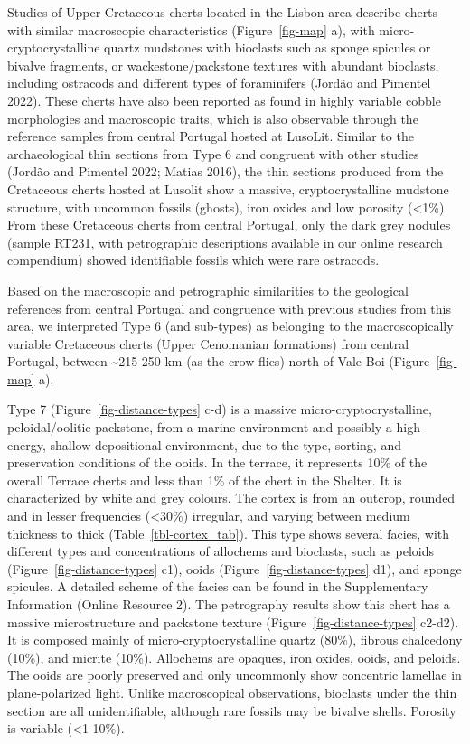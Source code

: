 \documentclass[
  a4paper,
  DIV=11,
  numbers=noendperiod]{scrreprt}
\begin{document}
Studies of Upper Cretaceous cherts located in the Lisbon area describe
cherts with similar macroscopic characteristics (Figure~\ref{fig-map}
a), with micro-cryptocrystalline quartz mudstones with bioclasts such as
sponge spicules or bivalve fragments, or wackestone/packstone textures
with abundant bioclasts, including ostracods and different types of
foraminifers (Jordão and Pimentel 2022). These cherts have also been
reported as found in highly variable cobble morphologies and macroscopic
traits, which is also observable through the reference samples from
central Portugal hosted at LusoLit. Similar to the archaeological thin
sections from Type 6 and congruent with other studies (Jordão and
Pimentel 2022; Matias 2016), the thin sections produced from the
Cretaceous cherts hosted at Lusolit show a massive, cryptocrystalline
mudstone structure, with uncommon fossils (ghosts), iron oxides and low
porosity (\textless1\%). From these Cretaceous cherts from central
Portugal, only the dark grey nodules (sample RT231, with petrographic
descriptions available in our online research compendium) showed
identifiable fossils which were rare ostracods.

Based on the macroscopic and petrographic similarities to the geological
references from central Portugal and congruence with previous studies
from this area, we interpreted Type 6 (and sub-types) as belonging to
the macroscopically variable Cretaceous cherts (Upper Cenomanian
formations) from central Portugal, between \textasciitilde215-250 km (as
the crow flies) north of Vale Boi (Figure~\ref{fig-map} a).

Type 7 (Figure~\ref{fig-distance-types} c-d) is a massive
micro-cryptocrystalline, peloidal/oolitic packstone, from a marine
environment and possibly a high-energy, shallow depositional
environment, due to the type, sorting, and preservation conditions of
the ooids. In the terrace, it represents 10\% of the overall Terrace
cherts and less than 1\% of the chert in the Shelter. It is
characterized by white and grey colours. The cortex is from an outcrop,
rounded and in lesser frequencies (\textless30\%) irregular, and varying
between medium thickness to thick (Table~\ref{tbl-cortex_tab}). This
type shows several facies, with different types and concentrations of
allochems and bioclasts, such as peloids
(Figure~\ref{fig-distance-types} c1), ooids
(Figure~\ref{fig-distance-types} d1), and sponge spicules. A detailed
scheme of the facies can be found in the Supplementary Information
(Online Resource 2). The petrography results show this chert has a
massive microstructure and packstone texture
(Figure~\ref{fig-distance-types} c2-d2). It is composed mainly of
micro-cryptocrystalline quartz (80\%), fibrous chalcedony (10\%), and
micrite (10\%). Allochems are opaques, iron oxides, ooids, and peloids.
The ooids are poorly preserved and only uncommonly show concentric
lamellae in plane-polarized light. Unlike macroscopical observations,
bioclasts under the thin section are all unidentifiable, although rare
fossils may be bivalve shells. Porosity is variable (\textless1-10\%).
\end{document}

